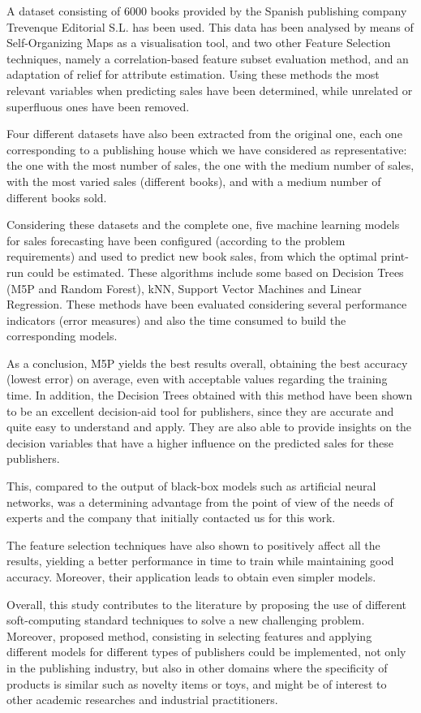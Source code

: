 \documentclass[a4paper,10pt,twocolumn,preprint,3p]{elsarticle}
\begin{document}
A dataset consisting of 6000 books provided by the Spanish publishing
company Trevenque Editorial S.L. has been used. This data has been
analysed by means of Self-Organizing Maps as a visualisation tool, and
two other Feature Selection techniques, namely a correlation-based
feature subset evaluation method, and an adaptation of relief for
attribute estimation. Using these methods the most relevant variables
when predicting sales have been determined, while unrelated or
superfluous ones have been removed. 

Four different datasets have also been extracted from the original
one, each one corresponding to a publishing house which we have
considered as representative: the one with the most number of sales,
the one with the medium number of sales, with the most varied sales
(different books), and with a medium number of different books sold. 

Considering these datasets and the complete one, five machine learning
models for sales forecasting have been configured (according to the
problem requirements) and used to predict new book sales, from which
the optimal print-run could be estimated. These algorithms include
some based on Decision Trees (M5P and Random Forest), kNN, Support
Vector Machines and Linear Regression. 
These methods have been evaluated considering several performance
indicators (error measures) and also the time consumed to build the
corresponding models. 

As a conclusion, M5P yields the best results overall, obtaining the best accuracy 
(lowest error) on average, even with acceptable values regarding the training time.
In addition, the Decision Trees obtained with this method have been
shown to be an excellent decision-aid tool for publishers, since they are accurate 
and quite easy to understand and apply. 
They are also able to provide insights on the decision variables that
have a higher influence on the predicted sales for these publishers. 

This, compared to the output of black-box models such as artificial
neural networks, was a determining advantage from the point of view of
the needs of experts and the company that initially contacted us for
this work. 

The feature selection techniques have also shown to positively affect
all the results, yielding a better performance in time to train while
maintaining good accuracy. Moreover, their application leads to obtain
even simpler models. 

Overall, this study contributes to the literature by proposing the use
of different soft-computing standard techniques to solve a new
challenging problem. 
Moreover, proposed method, consisting in selecting features and
applying different models for different types of publishers could be
implemented, not only in the publishing  
industry, but also in other domains where the specificity of products
is similar such as novelty items or toys, and might be of interest to other 
academic researches and industrial practitioners.
\end{document}
